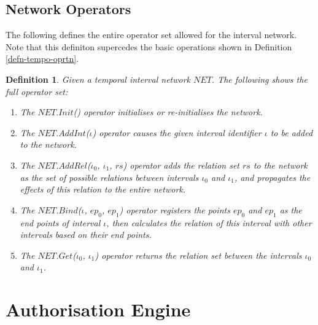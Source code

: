 \documentclass[11pt]{report}
\newtheorem{vdefinition}{Definition}[chapter]
\begin{document}
      \subsection{Network Operators}
        \label{subs-impln-netop}

        The following defines the entire operator set allowed for the interval
        network. Note that this definiton supercedes the basic operations
        shown in Definition \ref{defn-tempo-oprtn}.

        \begin{vdefinition}
          Given a temporal interval network $NET$. The following shows the
          full operator set:

          \begin{enumerate}
            \item
              The $NET.Init$() operator initialises or re-initialises the
              network.

            \item
              The $NET.AddInt$($\iota$) operator causes the given interval
              identifier $\iota$ to be added to the network. 

            \item
              The $NET$.$AddRel$($\iota_0$, $\iota_1$, $rs$) operator adds the
              relation set $rs$ to the network as the set of possible
              relations between intervals $\iota_0$ and $\iota_1$, and
              propagates the effects of this relation to the entire network.

            \item
              The $NET$.$Bind$($\iota$, $ep_0$, $ep_1$) operator registers the
              points $ep_0$ and $ep_1$ as the end points of interval $\iota$,
              then calculates the relation of this interval with other
              intervals based on their end points.

            \item
              The $NET$.$Get$($\iota_0$, $\iota_1$) operator returns the
              relation set between the intervals $\iota_0$ and $\iota_1$.
          \end{enumerate}
        \end{vdefinition}

    \section{Authorisation Engine}
      \label{sect-impln-authe}
\end{document}
